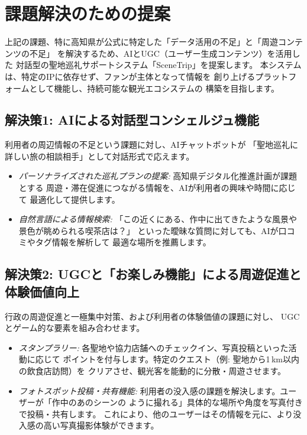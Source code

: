\documentclass{docs}
\begin{document}
\section{課題解決のための提案}
上記の課題、特に高知県が公式に特定した「データ活用の不足」と「周遊コンテンツの不足」\cite{kochi_dx_plan}
を解決するため、AIとUGC（ユーザー生成コンテンツ）を活用した
対話型の聖地巡礼サポートシステム「SceneTrip」を提案します。
本システムは、特定のIPに依存せず、ファンが主体となって情報を
創り上げるプラットフォームとして機能し、持続可能な観光エコシステムの
構築を目指します。

\subsection{解決策1: AIによる対話型コンシェルジュ機能}
利用者の周辺情報の不足という課題に対し、AIチャットボットが
「聖地巡礼に詳しい旅の相談相手」として対話形式で応えます。
\begin{itemize}
	\item \emph{パーソナライズされた巡礼プランの提案:}
	高知県デジタル化推進計画\cite{kochi_dx_plan}が課題とする
	周遊・滞在促進につながる情報を、AIが利用者の興味や時間に応じて
	最適化して提供します。
	\item \emph{自然言語による情報検索:}
	「この近くにある、作中に出てきたような風景や景色が眺められる喫茶店は？」
	といった曖昧な質問に対しても、AIが口コミやタグ情報を解析して
	最適な場所を推薦します。
\end{itemize}

\subsection{解決策2: UGCと「お楽しみ機能」による周遊促進と体験価値向上}
行政の周遊促進と一極集中対策、および利用者の体験価値の課題に対し、
UGCとゲーム的な要素を組み合わせます。
\begin{itemize}
	\item \emph{スタンプラリー:}
	各聖地や協力店舗へのチェックイン、写真投稿といった活動に応じて
	ポイントを付与します。特定のクエスト（例: 聖地から1\,km以内の飲食店訪問）を
	クリアさせ、観光客を能動的に分散・周遊させます。
	\item \emph{フォトスポット投稿・共有機能:}
	利用者の没入感の課題を解決します。ユーザーが「作中のあのシーンの
	ように撮れる」具体的な場所や角度を写真付きで投稿・共有します。
	これにより、他のユーザーはその情報を元に、より没入感の高い写真撮影体験ができます。
\end{itemize}
\end{document}
